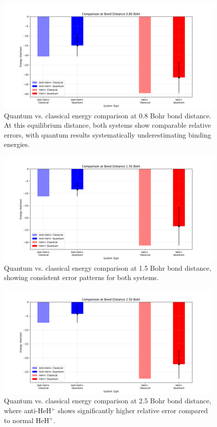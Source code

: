 \documentclass[10pt,twocolumn,a4paper]{article}
\begin{document}
\begin{figure}[t!]
    \centering
    \includegraphics[width=\columnwidth]{graphs/quantum_comparison_distance_0.80.png}
    \caption{Quantum vs. classical energy comparison at 0.8 Bohr bond distance. At this equilibrium distance, both systems show comparable relative errors, with quantum results systematically underestimating binding energies.}
    \label{fig:distance_comparison_08}
\end{figure}

\begin{figure}[t!]
    \centering
    \includegraphics[width=\columnwidth]{graphs/quantum_comparison_distance_1.50.png}
    \caption{Quantum vs. classical energy comparison at 1.5 Bohr bond distance, showing consistent error patterns for both systems.}
    \label{fig:distance_comparison_15}
\end{figure}

\begin{figure}[t!]
    \centering
    \includegraphics[width=\columnwidth]{graphs/quantum_comparison_distance_2.50.png}
    \caption{Quantum vs. classical energy comparison at 2.5 Bohr bond distance, where anti-HeH$^+$ shows significantly higher relative error compared to normal HeH$^+$.}
    \label{fig:distance_comparison_25}
\end{figure}
\end{document}
